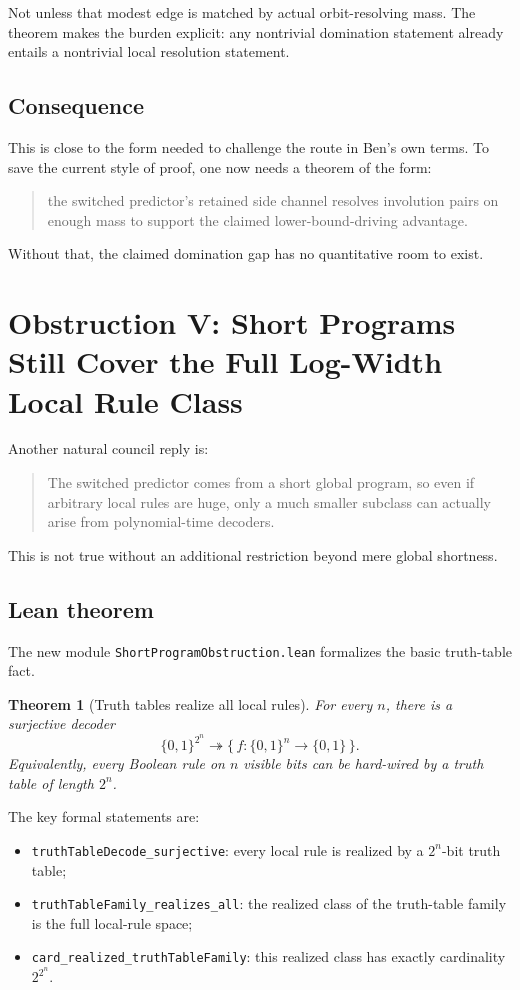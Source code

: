\documentclass[11pt]{article}
\newtheorem{theorem}{Theorem}[section]
\theoremstyle{remark}
\begin{document}
Not unless that modest edge is matched by actual orbit-resolving mass.  The theorem makes the
burden explicit: any nontrivial domination statement already entails a nontrivial local resolution
statement.

\subsection{Consequence}

This is close to the form needed to challenge the route in Ben's own terms.  To save the current
style of proof, one now needs a theorem of the form:
\begin{quote}
the switched predictor's retained side channel resolves involution pairs on enough mass to support
the claimed lower-bound-driving advantage.
\end{quote}

Without that, the claimed domination gap has no quantitative room to exist.

\section{Obstruction V: Short Programs Still Cover the Full Log-Width Local Rule Class}

Another natural council reply is:
\begin{quote}
The switched predictor comes from a short global program, so even if arbitrary local rules are
huge, only a much smaller subclass can actually arise from polynomial-time decoders.
\end{quote}

This is not true without an additional restriction beyond mere global shortness.

\subsection{Lean theorem}

The new module \texttt{ShortProgramObstruction.lean} formalizes the basic truth-table fact.

\begin{theorem}[Truth tables realize all local rules]
For every \(n\), there is a surjective decoder
\[
  \{0,1\}^{2^n} \twoheadrightarrow \{\,f : \{0,1\}^n \to \{0,1\}\,\}.
\]
Equivalently, every Boolean rule on \(n\) visible bits can be hard-wired by a truth table of
length \(2^n\).
\end{theorem}

\noindent
The key formal statements are:
\begin{itemize}[leftmargin=1.5em]
  \item \texttt{truthTableDecode\_surjective}: every local rule is realized by a
  \(2^n\)-bit truth table;
  \item \texttt{truthTableFamily\_realizes\_all}: the realized class of the truth-table family is
  the full local-rule space;
  \item \texttt{card\_realized\_truthTableFamily}: this realized class has exactly cardinality
  \(2^{2^n}\).
\end{itemize}
\end{document}
